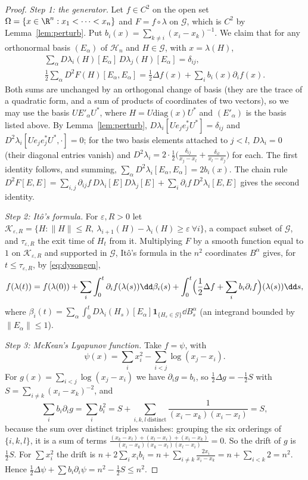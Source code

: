 \begin{proof}
\emph{Step 1: the generator.} Let $f\in C^2$ on the open set $\Omega=\{x\in\R^n:x_1<\dots<x_n\}$ and $F=f\circ\lambda$ on $\mathcal G$, which is $C^2$ by Lemma~\ref{lem:perturb}. Put $b_i(x)=\sum_{k\ne i}(x_i-x_k)^{-1}$. We claim that
for any orthonormal basis $(E_\alpha)$ of $\mathcal H_n$ and $H\in\mathcal G$, with $x=\lambda(H)$,
\begin{equation}\label{eq:dysongen}
\begin{gathered}
\sum_\alpha D\lambda_i(H)[E_\alpha]\,D\lambda_j(H)[E_\alpha]=\delta_{ij},\\
\frac12\sum_\alpha D^2F(H)[E_\alpha,E_\alpha]=\frac12\Delta f(x)+\sum_ib_i(x)\partial_if(x).
\end{gathered}
\end{equation}
Both sums are unchanged by an orthogonal change of basis (they are the trace of a quadratic form, and a sum of products of coordinates of two vectors), so we may use the basis $UE'_\alpha U^*$, where
$H=U\mathrm{diag}(x)U^*$ and $(E'_\alpha)$ is the basis listed above. By Lemma~\ref{lem:perturb}, $D\lambda_i[Ue_je_j^*U^*]=\delta_{ij}$ and $D^2\lambda_i[Ue_je_j^*U^*,\cdot]=0$; for the two basis elements attached to
$j<l$, $D\lambda_i=0$ (their diagonal entries vanish) and $D^2\lambda_i=2\cdot\frac12\bigl(\frac{\delta_{ij}}{x_j-x_l}+\frac{\delta_{il}}{x_l-x_j}\bigr)$ for each. The first identity follows, and summing,
$\sum_\alpha D^2\lambda_i[E_\alpha,E_\alpha]=2b_i(x)$. The chain rule $D^2F[E,E]=\sum_{i,j}\partial_{ij}f\,D\lambda_i[E]D\lambda_j[E]+\sum_i\partial_if\,D^2\lambda_i[E,E]$ gives the second identity.

\emph{Step 2: It\^o's formula.} For $\varepsilon,R>0$ let $\mathcal K_{\varepsilon,R}=\{H:\|H\|\le R,\ \lambda_{i+1}(H)-\lambda_i(H)\ge\varepsilon\ \forall i\}$, a compact subset of $\mathcal G$, and $\tau_{\varepsilon,R}$ the exit time of $H_t$ from it.
Multiplying $F$ by a smooth function equal to $1$ on $\mathcal K_{\varepsilon,R}$ and supported in $\mathcal G$, It\^o's formula in the $n^2$ coordinates $B^\alpha$ gives, for $t\le\tau_{\varepsilon,R}$, by \eqref{eq:dysongen},
\[
f(\lambda(t))=f(\lambda(0))+\sum_i\int_0^t\partial_if(\lambda(s))\dd\beta_i(s)+\int_0^t\Bigl(\frac12\Delta f+\sum_ib_i\partial_if\Bigr)(\lambda(s))\dd s,
\]
where $\beta_i(t)=\sum_\alpha\int_0^tD\lambda_i(H_s)[E_\alpha]\mathbf 1_{\{H_s\in\mathcal G\}}\dd B^\alpha_s$ (an integrand bounded by $\|E_\alpha\|\le1$).

\emph{Step 3: McKean's Lyapunov function.} Take $f=\psi$, with
\[
\psi(x)=\sum_ix_i^2-\sum_{i<j}\log(x_j-x_i).
\]
For $g(x)=\sum_{i<j}\log(x_j-x_i)$ we have $\partial_ig=b_i$, so $\frac12\Delta g=-\frac12S$ with $S=\sum_{i\ne k}(x_i-x_k)^{-2}$, and
\[
\sum_ib_i\partial_ig=\sum_ib_i^2=S+\sum_{i,k,l\ \text{distinct}}\frac1{(x_i-x_k)(x_i-x_l)}=S,
\]
because the sum over distinct triples vanishes: grouping the six orderings of $\{i,k,l\}$, it is a sum of terms $\frac{(x_k-x_l)+(x_l-x_i)+(x_i-x_k)}{(x_i-x_k)(x_k-x_l)(x_l-x_i)}=0$. So the drift of $g$ is $\frac12S$.
For $\sum x_i^2$ the drift is $n+2\sum_ix_ib_i=n+\sum_{i\ne k}\frac{2x_i}{x_i-x_k}=n+\sum_{i<k}2=n^2$. Hence $\frac12\Delta\psi+\sum b_i\partial_i\psi=n^2-\frac12S\le n^2$.


\end{proof}
